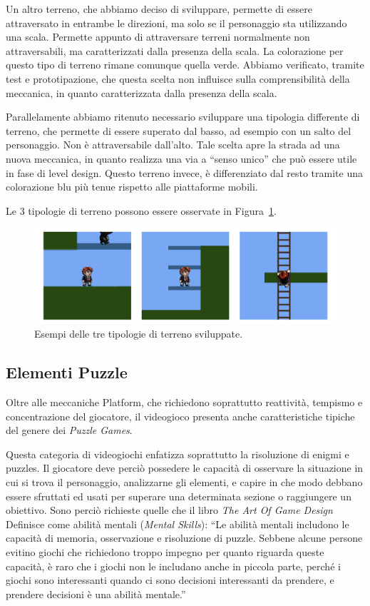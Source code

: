 Un altro terreno, che abbiamo deciso di sviluppare, permette di essere attraversato in entrambe le direzioni, ma solo se il personaggio sta utilizzando una scala. Permette appunto di attraversare terreni normalmente non attraversabili, ma caratterizzati dalla presenza della scala. La colorazione per questo tipo di terreno rimane comunque quella verde. Abbiamo verificato, tramite test e prototipazione, che questa scelta non influisce sulla comprensibilità della meccanica, in quanto caratterizzata dalla presenza della scala.

Parallelamente abbiamo ritenuto necessario sviluppare una tipologia differente di terreno, che permette di essere superato dal basso, ad esempio con un salto del personaggio. Non è attraversabile dall’alto. Tale scelta apre la strada ad una nuova meccanica, in quanto realizza una via a “senso unico” che può essere utile in fase di level design. Questo terreno invece, è differenziato dal resto tramite una colorazione blu più tenue rispetto alle piattaforme mobili.

Le 3 tipologie di terreno possono essere osservate in Figura~\ref{fig:platform_terreni}.

\begin{figure}%
	\centering
	\includegraphics[width= \columnwidth]{images/gameDesign/08.jpg}
	\caption{Esempi delle tre tipologie di terreno sviluppate.}
	\label{fig:platform_terreni}
\end{figure}

\subsection{Elementi Puzzle}
\label{elementi_puzzle}

Oltre alle meccaniche Platform, che richiedono soprattutto reattività, tempismo e concentrazione del giocatore, il videogioco presenta anche caratteristiche tipiche del genere dei \textit{Puzzle Games}.

Questa categoria di videogiochi enfatizza soprattutto la risoluzione di enigmi e puzzles. Il giocatore deve perciò possedere le capacità di osservare la situazione in cui si trova il personaggio, analizzarne gli elementi, e capire in che modo debbano essere sfruttati ed usati per superare una determinata sezione o raggiungere un obiettivo.
Sono perciò richieste quelle che il libro \textit{The Art Of Game Design}\cite{artOfGameDesign} Definisce come abilità mentali (\textit{Mental Skills}):
“Le abilità mentali includono le capacità di memoria, osservazione e risoluzione di puzzle. Sebbene alcune persone evitino giochi che richiedono troppo impegno per quanto riguarda queste capacità, è raro che i giochi non le includano anche in piccola parte, perché i giochi sono interessanti quando ci sono decisioni interessanti da prendere, e prendere decisioni è una abilità mentale.”

